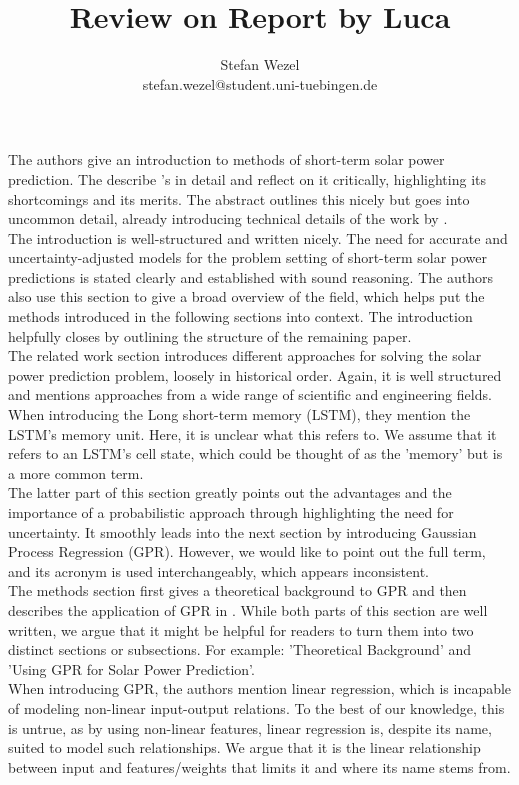 \documentclass{article} %
\title{Review on Report by Luca \vspace{0.5cm}}
\author{Stefan Wezel \\ stefan.wezel@student.uni-tuebingen.de}
\def\figwidth{.5\linewidth}
\def\figheight{.15\textheight}
\begin{document}
\maketitle

The authors give an introduction to methods of short-term solar power prediction. The describe \citet{lawati2020short}'s in detail and reflect on it critically, highlighting its shortcomings and its merits. The abstract outlines this nicely but goes into uncommon detail, already introducing technical details of the work by \citet{lawati2020short}.\\
The introduction is well-structured and written nicely. The need for accurate and uncertainty-adjusted models for the problem setting of short-term solar power predictions is stated clearly and established with sound reasoning. The authors also use this section to give a broad overview of the field, which helps put the methods introduced in the following sections into context. The introduction helpfully closes by outlining the structure of the remaining paper.\\
The related work section introduces different approaches for solving the solar power prediction problem, loosely in historical order. Again, it is well structured and mentions approaches from a wide range of scientific and engineering fields. When introducing the Long short-term memory (LSTM), they mention the LSTM's memory unit. Here, it is unclear what this refers to. We assume that it refers to an LSTM's cell state, which could be thought of as the 'memory' but is a more common term.\\
The latter part of this section greatly points out the advantages and the importance of a probabilistic approach through highlighting the need for uncertainty. It smoothly leads into the next section by introducing Gaussian Process Regression (GPR). However, we would like to point out the full term, and its acronym is used interchangeably, which appears inconsistent.\\
The methods section first gives a theoretical background to GPR and then describes the application of GPR in \citet{lawati2020short}. While both parts of this section are well written, we argue that it might be helpful for readers to turn them into two distinct sections or subsections. For example: 'Theoretical Background' and 'Using GPR for Solar Power Prediction'.\\
When introducing GPR, the authors mention linear regression, which is incapable of modeling non-linear input-output relations. To the best of our knowledge, this is untrue, as by using non-linear features, linear regression is, despite its name, suited to model such relationships. We argue that it is the linear relationship between input and features/weights that limits it and where its name stems from.\\
\end{document}
